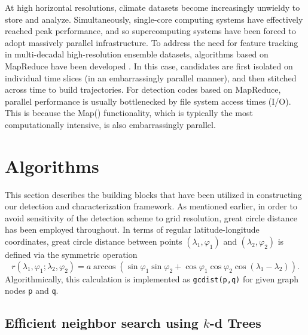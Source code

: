 \documentclass[gmdd, hvmath, online]{copernicus_discussions}
\begin{document}
At high horizontal resolutions, climate datasets become increasingly unwieldy to store and analyze.  Simultaneously, single-core computing systems have effectively reached peak performance, and so  supercomputing systems have been forced to adopt massively parallel infrastructure.  To address the need for feature tracking in multi-decadal high-resolution ensemble datasets, algorithms based on MapReduce have been developed \citep{Prabhat2012,zarzycki2014multidecadal}.  In this case, candidates are first isolated on individual time slices (in an embarrassingly parallel manner), and then stitched across time to build trajectories.  For detection codes based on MapReduce, parallel performance is usually bottlenecked by file system access times (I/O).  This is because the Map() functionality, which is typically the most computationally intensive, is also embarrassingly parallel.

\section{Algorithms}

This section describes the building blocks that have been utilized in constructing our detection and characterization framework.  As mentioned earlier, in order to avoid sensitivity of the detection scheme to grid resolution, great circle distance has been employed throughout.  In terms of regular latitude-longitude coordinates, great circle distance between points $(\lambda_1, \varphi_1)$ and $(\lambda_2, \varphi_2)$ is defined via the symmetric operation
\begin{equation}
r(\lambda_1, \varphi_1; \lambda_2, \varphi_2) = a \arccos \left( \sin \varphi_1 \sin \varphi_2 + \cos \varphi_1 \cos \varphi_2 \cos (\lambda_1 - \lambda_2) \right).
\end{equation}  Algorithmically, this calculation is implemented as \texttt{gcdist(p,q)} for given graph nodes \texttt{p} and \texttt{q}.

\subsection{Efficient neighbor search using $k$-d Trees}
\end{document}
